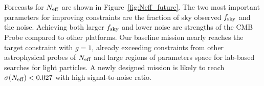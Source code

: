 Forecasts for ${N_{\rm eff}}$ are shown in Figure~\ref{fig:Neff_future}.  The two most important parameters for improving constraints
are the fraction of sky observed $f_{\rm sky}$ and the noise. Achieving both larger $f_{\rm sky}$ and
lower noise are strengths of the CMB Probe compared to other platforms. 
Our baseline mission nearly reaches 
the target constraint with $g=1$, already exceeding constraints from other astrophysical probes of ${N_{\rm eff}}$ and large regions of parameters space for lab-based searches for light particles.
A newly designed mission is likely to reach $\sigma({N_{\rm eff}}) < 0.027$
with high signal-to-noise ratio. 



